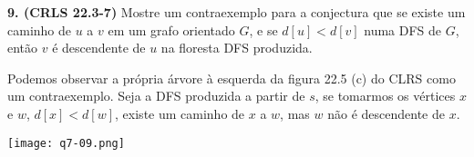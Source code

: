 
\noindent\textbf{9. (CRLS 22.3-7)} Mostre um contraexemplo para a conjectura que se existe um caminho de $u$ a $v$ em um grafo orientado $G$, e se $d[u] < d[v]$ numa DFS de $G$, então $v$ é descendente de $u$ na floresta DFS produzida.

Podemos observar a própria árvore à esquerda da figura 22.5 (c) do CLRS como um contraexemplo. Seja a DFS produzida a partir de $s$, se tomarmos os vértices $x$ e $w$, $d[x] < d[w]$, existe um caminho de $x$ a $w$, mas $w$ não é descendente de $x$.
\begin{center}
\texttt{[image: q7-09.png]}
\label{fig:7.9-1}
\end{center}